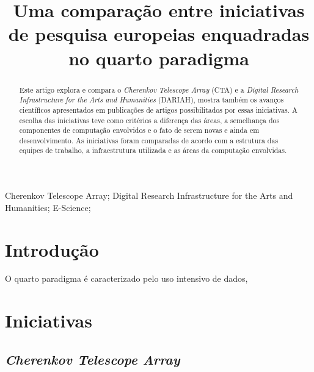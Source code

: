 \documentclass[10pt, conference, compsocconf]{IEEEtran}
\begin{document}
\title{Uma comparação entre iniciativas de pesquisa europeias enquadradas no quarto paradigma}

\author{
}

\maketitle


\begin{abstract}
Este artigo explora e compara o \textit{Cherenkov Telescope Array} (CTA) e a \textit{Digital Research Infrastructure for the Arts and Humanities} (DARIAH), mostra também os avanços científicos apresentados em publicações de artigos possibilitados por essas iniciativas. A escolha das iniciativas teve como critérios a diferença das áreas, a semelhança dos componentes de computação envolvidos e o fato de serem novas e ainda em desenvolvimento. As iniciativas foram comparadas de acordo com a estrutura das equipes de trabalho, a infraestrutura utilizada e as áreas da computação envolvidas.
\end{abstract}

\begin{IEEEkeywords}
Cherenkov Telescope Array; Digital Research Infrastructure for the Arts and Humanities; E-Science;
\end{IEEEkeywords}

\IEEEpeerreviewmaketitle

\section{Introdução}

O quarto paradigma é caracterizado pelo uso intensivo de dados, 

\section{Iniciativas}

\subsection{\textit{Cherenkov Telescope Array}}
\end{document}
